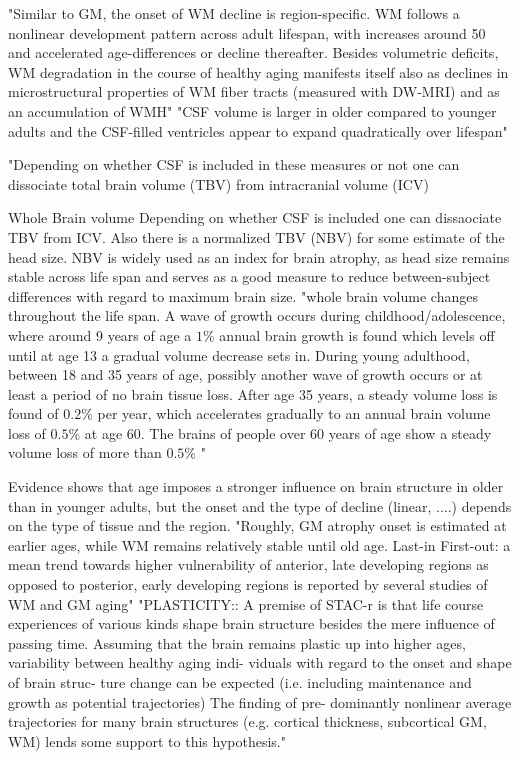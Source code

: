 \documentclass[twoside,onecolumn]{article}
\begin{document}
"Similar to GM, the onset of WM decline is region-specific. WM follows a nonlinear development pattern across adult lifespan, with increases around 50 and accelerated age-differences or decline thereafter. Besides volumetric deficits, WM degradation in the course of healthy aging manifests itself also as declines in microstructural properties of WM fiber tracts (measured with DW-MRI) and as an accumulation of WMH"
"CSF volume is larger in older compared to younger adults and the CSF-filled ventricles appear to expand quadratically over lifespan"

"Depending on whether CSF is included in these measures or not one can dissociate total brain volume (TBV) from intracranial volume (ICV)


Whole Brain volume
Depending on whether CSF is included one can dissaociate TBV from ICV. Also there is a normalized TBV (NBV) for some estimate of the head size. NBV is widely used as an index for brain atrophy, as head size remains stable across life span and serves as a good measure to reduce between-subject differences with regard to maximum brain size.
"whole brain volume changes throughout the life span. A wave of growth occurs during childhood/adolescence, where around 9 years of age a $1\%$ annual brain growth is found which levels off until at age 13 a gradual volume decrease sets in. During young adulthood, between 18 and 35 years of age, possibly another wave of growth occurs or at least a period of no brain tissue loss. After age 35 years, a steady volume loss is found of $0.2\%$ per year, which accelerates gradually to an annual brain volume loss of $0.5\%$ at age 60. The brains of people over 60 years of age show a steady volume loss of more than $0.5\%$ \cite{hedman2012human}"

Evidence shows that age imposes a stronger influence on brain structure in older than in younger adults, but the onset and the type of decline (linear, ....) depends on the type of tissue and the region.
"Roughly, GM atrophy onset is estimated at earlier ages, while WM remains relatively stable until old age. Last-in First-out: a mean trend towards higher vulnerability of anterior, late developing regions as opposed to posterior, early developing regions is reported by several studies of WM and GM aging"
"PLASTICITY:: A premise of STAC-r is that life course experiences of various kinds shape brain structure besides the mere influence of passing time. Assuming that the brain remains plastic up into higher ages, variability between healthy aging indi- viduals with regard to the onset and shape of brain struc- ture change can be expected (i.e. including maintenance and growth as potential trajectories) The finding of pre- dominantly nonlinear average trajectories for many brain structures (e.g. cortical thickness, subcortical GM, WM) lends some support to this hypothesis."
\end{document}
